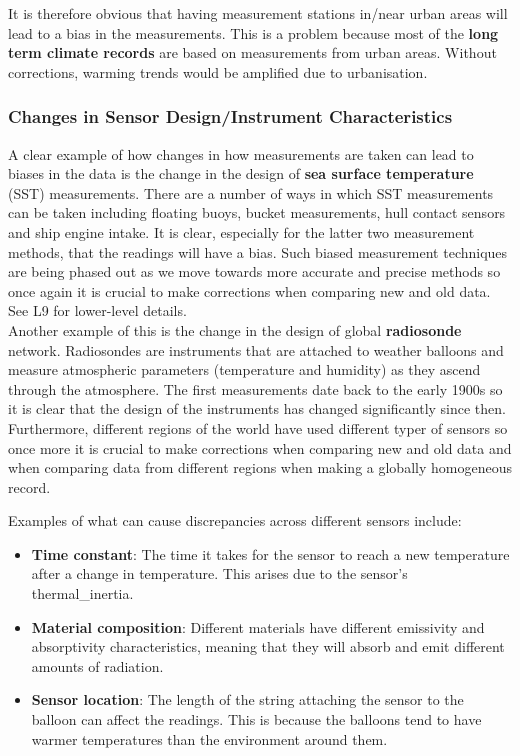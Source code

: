 It is therefore obvious that having measurement stations in/near urban areas will
lead to a bias in the measurements. This is a problem because most of the
\textbf{long term climate records} are based on measurements from urban areas.
Without corrections, warming trends would be amplified due to urbanisation.

\subsubsection{Changes in Sensor Design/Instrument Characteristics}
\label{sec:changes_in_sensor_design}

A clear example of how changes in how measurements are taken can lead to biases
in the data is the change in the design of \textbf{sea surface temperature} 
(\gls{SST}) measurements. There are a number of ways in which \gls{SST} measurements
can be taken including floating buoys, bucket measurements, hull contact sensors
and ship engine intake. It is clear, especially for the latter two measurement
methods, that the readings will have a bias. Such biased measurement techniques
are being phased out as we move towards more accurate and precise methods so 
once again it is crucial to make corrections when comparing new and old data.
See L9 for lower-level details.\\

Another example of this is the change in the design of global \textbf{radiosonde}
network. Radiosondes are instruments that are attached to weather balloons and
measure atmospheric parameters (temperature and humidity) as they ascend through
the atmosphere. The first measurements date back to the early 1900s so it is 
clear that the design of the instruments has changed significantly since then.
Furthermore, different regions of the world have used different typer of sensors
so once more it is crucial to make corrections when comparing new and old data 
and when comparing data from different regions when making a globally homogeneous
record.

Examples of what can cause discrepancies across different sensors include:
\begin{itemize}
    \item \textbf{Time constant}: The time it takes for the sensor to reach a new
    temperature after a change in temperature. This arises due to the sensor's
    \gls{thermal_inertia}.
    \item \textbf{Material composition}: Different materials have different
    \gls{emissivity} and \gls{absorptivity} characteristics, meaning that they
    will absorb and emit different amounts of radiation.
    \item \textbf{Sensor location}: The length of the string attaching the sensor
    to the balloon can affect the readings. This is because the balloons tend to
    have warmer temperatures than the environment around them.
\end{itemize}

